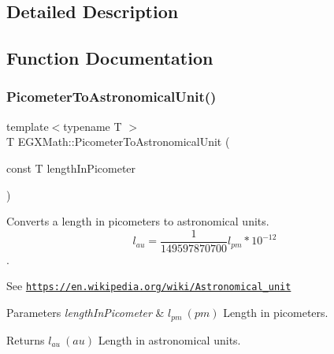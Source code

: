 \subsection{Detailed Description}


\subsection{Function Documentation}
\mbox{\label{group___e_g_x_math-_conversions-_length_conversions-_s_i-_picometer-_astronomical_gae051f7eb0eb85b99c614183acc6b8ea6}} 
\subsubsection{\texorpdfstring{Picometer\+To\+Astronomical\+Unit()}{PicometerToAstronomicalUnit()}}
{\footnotesize\ttfamily template$<$typename T $>$ \\
T E\+G\+X\+Math\+::\+Picometer\+To\+Astronomical\+Unit (\begin{DoxyParamCaption}\item[{const T}]{length\+In\+Picometer }\end{DoxyParamCaption})}



Converts a length in picometers to astronomical units. \[ l_{au}= \frac{1}{149597870700} l_{pm} * 10^{-12} \]. 

See \href{https://en.wikipedia.org/wiki/Astronomical_unit}{\tt https\+://en.\+wikipedia.\+org/wiki/\+Astronomical\+\_\+unit} 
\begin{DoxyParams}{Parameters}
{\em length\+In\+Picometer} & $ l_{pm}\ (pm)$ Length in picometers. \\
\hline
\end{DoxyParams}
\begin{DoxyReturn}{Returns}
$ l_{au}\ (au)$ Length in astronomical units. 
\end{DoxyReturn}
\mbox{\label{group___e_g_x_math-_conversions-_length_conversions-_s_i-_picometer-_astronomical_ga4d8abbec265ae9e35ac109356db5b89a}} 
